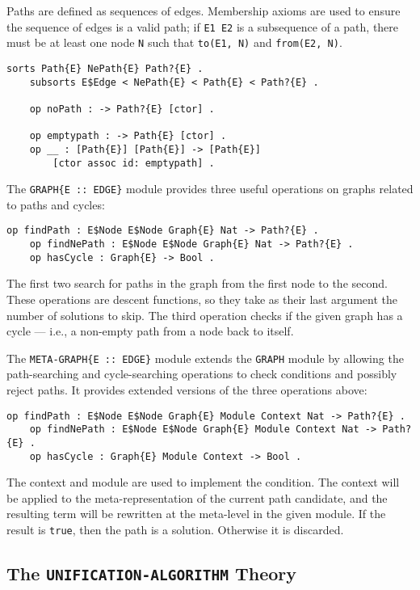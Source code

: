 \documentclass[11pt]{article}
\newcommand{\TitleListing}[1]{\texorpdfstring{\lstinline|#1|}{#1}}
\begin{document}
Paths are defined as sequences of edges. Membership axioms are used to ensure
the sequence of edges is a valid path; if \lstinline|E1 E2| is a subsequence of
a path, there must be at least one node \lstinline|N| such that
\lstinline|to(E1, N)| and \lstinline|from(E2, N)|.
\begin{lstlisting}[language=Maude, style=smalllisting]
    sorts Path{E} NePath{E} Path?{E} .
    subsorts E$Edge < NePath{E} < Path{E} < Path?{E} .

    op noPath : -> Path?{E} [ctor] .

    op emptypath : -> Path{E} [ctor] .
    op __ : [Path{E}] [Path{E}] -> [Path{E}]
        [ctor assoc id: emptypath] .
\end{lstlisting}

The \lstinline|GRAPH{E :: EDGE}| module provides three useful operations on
graphs related to paths and cycles:
\begin{lstlisting}[language=Maude, style=smalllisting]
    op findPath : E$Node E$Node Graph{E} Nat -> Path?{E} .
    op findNePath : E$Node E$Node Graph{E} Nat -> Path?{E} .
    op hasCycle : Graph{E} -> Bool .
\end{lstlisting}
The first two search for paths in the graph from the first node to the second.
These operations are descent functions, so they take as their last argument the
number of solutions to skip. The third operation checks if the given graph has
a cycle --- i.e., a non-empty path from a node back to itself.

The \lstinline|META-GRAPH{E :: EDGE}| module extends the \lstinline|GRAPH|
module by allowing the path-searching and cycle-searching operations to check
conditions and possibly reject paths. It provides extended versions of the
three operations above:
\begin{lstlisting}[language=Maude, style=smalllisting]
    op findPath : E$Node E$Node Graph{E} Module Context Nat -> Path?{E} .
    op findNePath : E$Node E$Node Graph{E} Module Context Nat -> Path?{E} .
    op hasCycle : Graph{E} Module Context -> Bool .
\end{lstlisting}
The context and module are used to implement the condition. The context will be
applied to the meta-representation of the current path candidate, and the
resulting term will be rewritten at the meta-level in the given module. If the
result is \lstinline|true|, then the path is a solution. Otherwise it is
discarded.

\subsection{The \TitleListing{UNIFICATION-ALGORITHM} Theory}
\label{subsection:unif-alg-mod}
\end{document}
